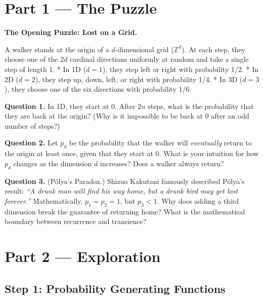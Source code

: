 \documentclass[12pt, a4paper]{article}
\begin{document}
\newpage

\section{Part 1 \texorpdfstring{---}{--} The Puzzle}

\begin{puzzlebox}
\textbf{The Opening Puzzle: Lost on a Grid.}

A walker stands at the origin of a $d$-dimensional grid ($\mathbb{Z}^d$). At each step, they choose one of the $2d$ cardinal directions uniformly at random and take a single step of length 1.
* In 1D ($d=1$), they step left or right with probability 1/2.
* In 2D ($d=2$), they step up, down, left, or right with probability 1/4.
* In 3D ($d=3$), they choose one of the six directions with probability 1/6.

\medskip
\textbf{Question 1.} In 1D, they start at 0. After $2n$ steps, what is the probability that they are back at the origin? (Why is it impossible to be back at 0 after an odd number of steps?)

\textbf{Question 2.} Let $p_{d}$ be the probability that the walker will \emph{eventually} return to the origin at least once, given that they start at 0. What is your intuition for how $p_{d}$ changes as the dimension $d$ increases? Does a walker always return?

\textbf{Question 3.} (Pólya's Paradox.) Shizuo Kakutani famously described Pólya's result: \textit{``A drunk man will find his way home, but a drunk bird may get lost forever.''} Mathematically, $p_1 = p_2 = 1$, but $p_3 < 1$. Why does adding a third dimension break the guarantee of returning home? What is the mathematical boundary between recurrence and transience?
\end{puzzlebox}

\newpage

\section{Part 2 \texorpdfstring{---}{--} Exploration}

\subsection{Step 1: Probability Generating Functions}
\end{document}
